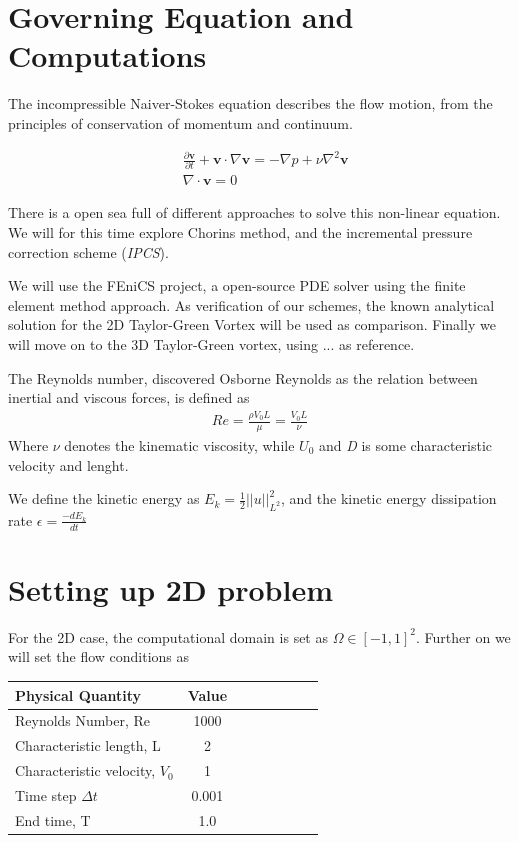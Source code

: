 \documentclass[a4paper,norsk]{article}
\begin{document}
\section*{Governing Equation and Computations}
The incompressible Naiver-Stokes equation describes the flow motion, from the principles of conservation of momentum
and continuum.

\begin{align}
&\frac{\partial \textbf{v}}{\partial t} + \textbf{v} \cdot \nabla \textbf{v} =
-\nabla p + \nu \nabla^2 \textbf{v} \\
&\nabla \cdot \textbf{v} = 0
\end{align}

There is a open sea full of different approaches to solve this non-linear equation. We will for this
time explore Chorins method, and the incremental pressure correction scheme (\textit{IPCS}).

We will use the FEniCS project, a open-source PDE solver using the finite element method approach.
As verification of our schemes, the known analytical solution for the 2D Taylor-Green Vortex will be used as comparison.
Finally we will move on to the 3D Taylor-Green vortex, using ... as reference.

The Reynolds number, discovered Osborne Reynolds as the relation between inertial and viscous forces, is defined
as
\begin{align}
Re = \frac{\rho V_{0} L}{\mu} = \frac{V_{0} L}{\nu}
\end{align}
Where $\nu$ denotes the kinematic viscosity, while $U_{0}$ and \textit{D} is some characteristic velocity and lenght.

We define the kinetic energy as $E_k = \frac{1}{2}||u||^2_{L^2}$, and the kinetic energy dissipation rate $\epsilon = \frac{-d E_k}{dt}$

\section*{Setting up 2D problem}

For the 2D case, the computational domain is set as $\Omega \in [-1, 1]^2$. Further on we will set
the flow conditions as \\

\begin{tabular}{l*{6}{c}r}
Physical Quantity              & Value  \\
\hline
Reynolds Number, Re & 1000   \\
Characteristic length, L           & 2     \\
Characteristic velocity, $V_{0}$   & 1     \\
Time step $\Delta t$ 			   & 0.001 \\
End time, T 					   & 1.0
\end{tabular}
\end{document}
